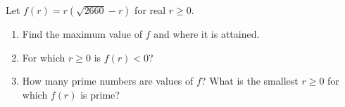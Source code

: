 Let $f(r)=r\left(\sqrt{2660}-r\right)$ for real $r\ge0$.
\begin{enumerate}
\item[(a)] Find the maximum value of $f$ and where it is attained.
\item[(b)] For which $r\ge0$ is $f(r)<0$?
\item[(c)] How many prime numbers are values of $f$? What is the smallest $r\ge0$ for which $f(r)$ is prime?
\end{enumerate}
